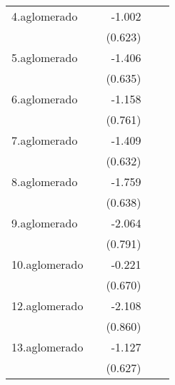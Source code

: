 {\begin{longtable}{l*{4}{D{.}{.}{-1}}}
\addlinespace
4.aglomerado&                     &      -1.002         &                     &                     \\
            &                     &     (0.623)         &                     &                     \\
\addlinespace
5.aglomerado&                     &      -1.406\sym{*}  &                     &                     \\
            &                     &     (0.635)         &                     &                     \\
\addlinespace
6.aglomerado&                     &      -1.158         &                     &                     \\
            &                     &     (0.761)         &                     &                     \\
\addlinespace
7.aglomerado&                     &      -1.409\sym{*}  &                     &                     \\
            &                     &     (0.632)         &                     &                     \\
\addlinespace
8.aglomerado&                     &      -1.759\sym{**} &                     &                     \\
            &                     &     (0.638)         &                     &                     \\
\addlinespace
9.aglomerado&                     &      -2.064\sym{**} &                     &                     \\
            &                     &     (0.791)         &                     &                     \\
\addlinespace
10.aglomerado&                     &      -0.221         &                     &                     \\
            &                     &     (0.670)         &                     &                     \\
\addlinespace
12.aglomerado&                     &      -2.108\sym{*}  &                     &                     \\
            &                     &     (0.860)         &                     &                     \\
\addlinespace
13.aglomerado&                     &      -1.127         &                     &                     \\
            &                     &     (0.627)         &                     &                     \\

\end{longtable}}
